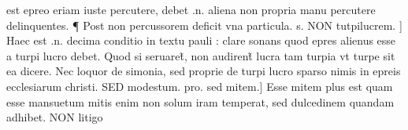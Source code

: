 \documentclass{article}
\begin{document}
\begin{pages}
est epreo eriam iuste percutere, debet .n. aliena non propria manu percutere delinquentes. ¶ Post non percussorem  deficit vna particula. s. NON tutpilucrem. ] Haec est .n. decima conditio in textu pauli : clare sonans quod epres alienus esse a turpi lucro debet. Quod si seruaret̃, non audirent̃ lucra tam turpia vt turpe sit ea dicere. Nec loquor de simonia, sed proprie de turpi lucro sparso nimis in epreis ecclesiarum christi. SED modestum. pro. sed mitem.] Esse mitem plus est quam esse mansuetum mitis enim non solum iram temperat, sed dulcedinem quandam adhibet. NON litigo\pend
\endnumbering
\end{pages}
\end{document}

